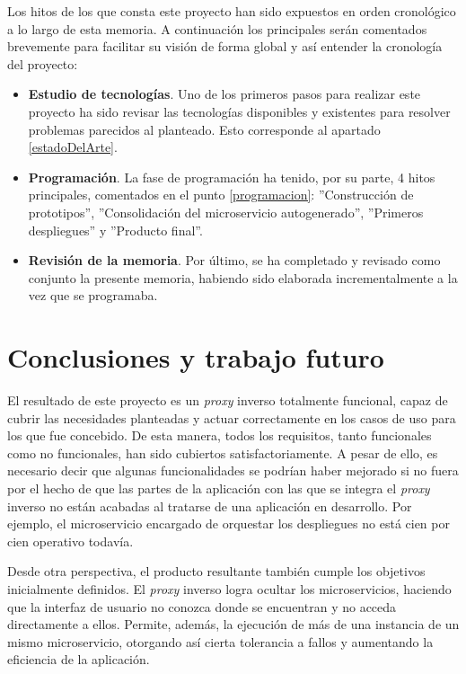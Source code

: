 \documentclass[11pt,spanish,listoffigures]{tfgetsinf}
\begin{document}
Los hitos de los que consta este proyecto han sido expuestos en orden cronológico a lo largo de esta memoria. A continuación los principales serán comentados brevemente para facilitar su visión de forma global y así entender la cronología del proyecto:

\begin{itemize}

	\item \textbf{Estudio de tecnologías}. Uno de los primeros pasos para realizar este proyecto ha sido revisar las tecnologías disponibles y existentes para resolver problemas parecidos al planteado. Esto corresponde al apartado \ref{estadoDelArte}.

	\item \textbf{Programación}. La fase de programación ha tenido, por su parte, 4 hitos principales, comentados en el punto \ref{programacion}: ''Construcción de prototipos'', ''Consolidación del microservicio autogenerado'', ''Primeros despliegues'' y ''Producto final''.

	\item \textbf{Revisión de la memoria}. Por último, se ha completado y revisado como conjunto la presente memoria, habiendo sido elaborada incrementalmente a la vez que se programaba.

\end{itemize}


\chapter{Conclusiones y trabajo futuro}

El resultado de este proyecto es un \emph{proxy} inverso totalmente funcional, capaz de cubrir las necesidades planteadas y actuar correctamente en los casos de uso para los que fue concebido. De esta manera, todos los requisitos, tanto funcionales como no funcionales, han sido cubiertos satisfactoriamente. A pesar de ello, es necesario decir que algunas funcionalidades se podrían haber mejorado si no fuera por el hecho de que las partes de la aplicación con las que se integra el \emph{proxy} inverso no están acabadas al tratarse de una aplicación en desarrollo. Por ejemplo, el microservicio encargado de orquestar los despliegues no está cien por cien operativo todavía.

Desde otra perspectiva, el producto resultante también cumple los objetivos inicialmente definidos. El \emph{proxy} inverso logra ocultar los microservicios, haciendo que la interfaz de usuario no conozca donde se encuentran y no acceda directamente a ellos. Permite, además, la ejecución de más de una instancia de un mismo microservicio, otorgando así cierta tolerancia a fallos y aumentando la eficiencia de la aplicación.
\end{document}

